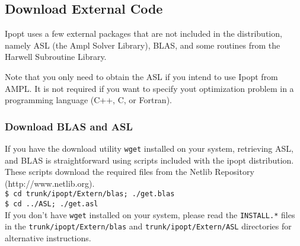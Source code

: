 \documentclass[letter,10pt]{article}
\begin{document}
\subsection{Download External Code}
Ipopt uses a few external packages that are not included in the
distribution, namely ASL (the Ampl Solver Library), BLAS, and
some routines from the Harwell Subroutine Library.

Note that you only need to obtain the ASL if you intend to use Ipopt
from AMPL.  It is not required if you want to specify yout
optimization problem in a programming language (C++, C, or Fortran).

\subsubsection{Download BLAS and ASL}
If you have the download utility \texttt{wget} installed on your
system, retrieving ASL, and BLAS is straightforward using scripts
included with the ipopt distribution. These scripts download the
required files from the Netlib Repository (http://www.netlib.org).\\

\noindent
{\tt \$ cd trunk/ipopt/Extern/blas; ./get.blas}\\
{\tt \$ cd ../ASL; ./get.asl}\\

\noindent
If you don't have \texttt{wget} installed on your system, please read
the \texttt{INSTALL.*} files in the \texttt{trunk/ipopt/Extern/blas}
and \texttt{trunk/ipopt/Extern/ASL} directories for alternative
instructions.
\end{document}
